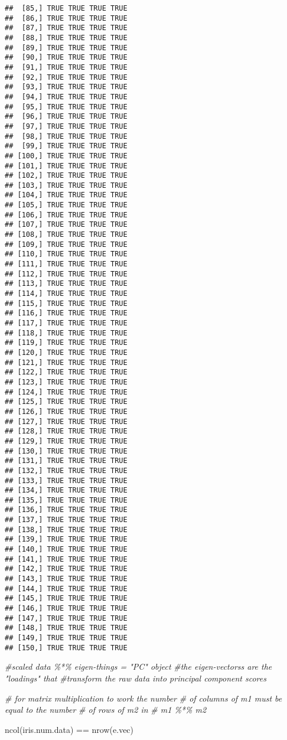 \documentclass[
]{book}
\newenvironment{Shaded}{\begin{snugshade}}{\end{snugshade}}
\newcommand{\CommentTok}[1]{\textcolor[rgb]{0.56,0.35,0.01}{\textit{#1}}}
\newcommand{\FunctionTok}[1]{\textcolor[rgb]{0.00,0.00,0.00}{#1}}
\newcommand{\NormalTok}[1]{#1}
\newcommand{\SpecialCharTok}[1]{\textcolor[rgb]{0.00,0.00,0.00}{#1}}
\begin{document}
\begin{verbatim}
##  [85,] TRUE TRUE TRUE TRUE
##  [86,] TRUE TRUE TRUE TRUE
##  [87,] TRUE TRUE TRUE TRUE
##  [88,] TRUE TRUE TRUE TRUE
##  [89,] TRUE TRUE TRUE TRUE
##  [90,] TRUE TRUE TRUE TRUE
##  [91,] TRUE TRUE TRUE TRUE
##  [92,] TRUE TRUE TRUE TRUE
##  [93,] TRUE TRUE TRUE TRUE
##  [94,] TRUE TRUE TRUE TRUE
##  [95,] TRUE TRUE TRUE TRUE
##  [96,] TRUE TRUE TRUE TRUE
##  [97,] TRUE TRUE TRUE TRUE
##  [98,] TRUE TRUE TRUE TRUE
##  [99,] TRUE TRUE TRUE TRUE
## [100,] TRUE TRUE TRUE TRUE
## [101,] TRUE TRUE TRUE TRUE
## [102,] TRUE TRUE TRUE TRUE
## [103,] TRUE TRUE TRUE TRUE
## [104,] TRUE TRUE TRUE TRUE
## [105,] TRUE TRUE TRUE TRUE
## [106,] TRUE TRUE TRUE TRUE
## [107,] TRUE TRUE TRUE TRUE
## [108,] TRUE TRUE TRUE TRUE
## [109,] TRUE TRUE TRUE TRUE
## [110,] TRUE TRUE TRUE TRUE
## [111,] TRUE TRUE TRUE TRUE
## [112,] TRUE TRUE TRUE TRUE
## [113,] TRUE TRUE TRUE TRUE
## [114,] TRUE TRUE TRUE TRUE
## [115,] TRUE TRUE TRUE TRUE
## [116,] TRUE TRUE TRUE TRUE
## [117,] TRUE TRUE TRUE TRUE
## [118,] TRUE TRUE TRUE TRUE
## [119,] TRUE TRUE TRUE TRUE
## [120,] TRUE TRUE TRUE TRUE
## [121,] TRUE TRUE TRUE TRUE
## [122,] TRUE TRUE TRUE TRUE
## [123,] TRUE TRUE TRUE TRUE
## [124,] TRUE TRUE TRUE TRUE
## [125,] TRUE TRUE TRUE TRUE
## [126,] TRUE TRUE TRUE TRUE
## [127,] TRUE TRUE TRUE TRUE
## [128,] TRUE TRUE TRUE TRUE
## [129,] TRUE TRUE TRUE TRUE
## [130,] TRUE TRUE TRUE TRUE
## [131,] TRUE TRUE TRUE TRUE
## [132,] TRUE TRUE TRUE TRUE
## [133,] TRUE TRUE TRUE TRUE
## [134,] TRUE TRUE TRUE TRUE
## [135,] TRUE TRUE TRUE TRUE
## [136,] TRUE TRUE TRUE TRUE
## [137,] TRUE TRUE TRUE TRUE
## [138,] TRUE TRUE TRUE TRUE
## [139,] TRUE TRUE TRUE TRUE
## [140,] TRUE TRUE TRUE TRUE
## [141,] TRUE TRUE TRUE TRUE
## [142,] TRUE TRUE TRUE TRUE
## [143,] TRUE TRUE TRUE TRUE
## [144,] TRUE TRUE TRUE TRUE
## [145,] TRUE TRUE TRUE TRUE
## [146,] TRUE TRUE TRUE TRUE
## [147,] TRUE TRUE TRUE TRUE
## [148,] TRUE TRUE TRUE TRUE
## [149,] TRUE TRUE TRUE TRUE
## [150,] TRUE TRUE TRUE TRUE
\end{verbatim}

\begin{Shaded}
\begin{Highlighting}[]
\CommentTok{\#scaled data \%*\% eigen{-}things = "PC" object}
\CommentTok{\#the eigen{-}vectorss are the "loadings" that }
\CommentTok{\#transform the raw data into principal component scores}
\end{Highlighting}
\end{Shaded}

\begin{Shaded}
\begin{Highlighting}[]
\CommentTok{\# for matrix multiplication to work the number}
\CommentTok{\# of columns of m1 must be equal to the number}
\CommentTok{\# of rows of m2 in}
\CommentTok{\# m1 \%*\% m2}

\FunctionTok{ncol}\NormalTok{(iris.num.data) }\SpecialCharTok{==} \FunctionTok{nrow}\NormalTok{(e.vec)}
\end{Highlighting}
\end{Shaded}
\end{document}
